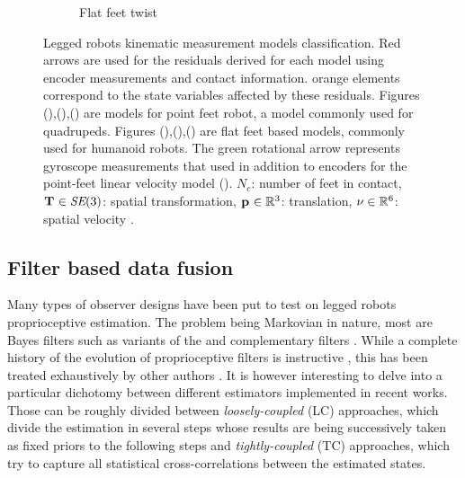 \begin{figure}
\begin{subfigure}{.33\linewidth}
        \caption{Flat feet twist}
        \label{fig:kin_flat_vel}
    \end{subfigure}%
    \caption{Legged robots kinematic measurement models classification. Red arrows are used for the residuals derived for each model using encoder measurements and contact information. 
    orange elements correspond to the state variables affected by these residuals. Figures (),(),() are models
    for point feet robot, a model commonly used for quadrupeds. Figures (),(),() are flat feet based models,
    commonly used for humanoid robots. The green rotational arrow represents gyroscope measurements that used in addition to encoders for the point-feet linear velocity model ().
    $N_c$: number of feet in contact, $\prescript{}{}{{\bf T}}_{} \in \textit{SE}(3)$: spatial transformation, $\prescript{}{}{{\bf p}}_{} \in \mathbb{R}^3$: translation, $\nu \in \mathbb{R}^6$: spatial velocity \cite[2.2]{featherstone2014rigid}. 
        }
    \label{fig:kin_models}
\end{figure}


\subsection{Filter based data fusion}
\label{sec:proprio_filters}

Many types of observer designs have been put to test on legged robots proprioceptive estimation. The problem being Markovian in nature,
most are Bayes filters such as variants of the \KalmanF \cite{kalman1960new} and complementary filters \cite{higgins1975comparison}. While a complete history of 
the evolution of proprioceptive filters is instructive 
\cite{gassmann2005localization, lin2005leg, lin2006sensor, cobano2008location, aoustin2008experimental, lebastard2011estimation, chilian2011multisensor, reinstein2011dead, 
gur2012model, ma2012robust, gorner2013leg}, 
this has been treated exhaustively by other authors \cite{bloesch2017state, camurri2017multisensory}. 
It is however interesting to delve into a particular dichotomy between different estimators implemented in recent works. Those can be 
roughly divided between \textit{loosely-coupled} (LC) approaches, which divide the estimation in several steps whose results are being successively taken as fixed priors to the 
following steps and \textit{tightly-coupled} (TC) approaches, which try to capture all statistical cross-correlations between the estimated states.

